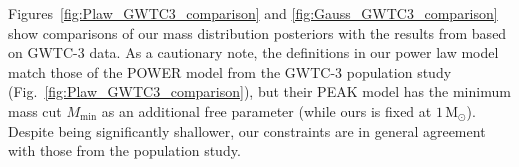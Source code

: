 \documentclass[]{aa}
\begin{document}
\begin{appendix}
Figures~\ref{fig:Plaw_GWTC3_comparison} and \ref{fig:Gauss_GWTC3_comparison} show comparisons of our mass distribution posteriors with the results from \citet{LVC2021_GWTC3pop} based on GWTC-3 \citep{LVC2021_GWTC3} data. As a cautionary note, the definitions in our power law model match those of the \textsc{POWER} model from the GWTC-3 population study (Fig.~\ref{fig:Plaw_GWTC3_comparison}), but their \textsc{PEAK} model has the minimum mass cut $M_\mathrm{min}$ as an additional free parameter (while ours is fixed at $1\,\mathrm{M_\odot}$). Despite being significantly shallower, our constraints are in general agreement with those from the population study. 

\end{appendix}
\end{document}
